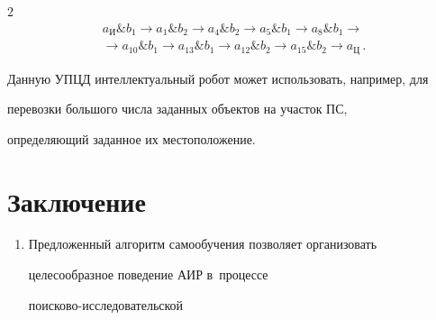 \begin{multicols}{2}
  \begin{multline*}


  a_{\mathrm{И}} \& b_1\to a_1 \& b_2\to a_4 \& b_2\to a_5 \& b_1\to a_8 \& 


b_1\to{}\\


  {}\to


  a_{10} \& b_1\to a_{13} \& b_1\to a_{12} \& b_2\to a_{15} \& b_2\to 


a_{\mathrm{Ц}}\,.


  \end{multline*}


  


  Данную УПЦД интеллектуальный робот может использовать, например, для 


перевозки большого чис\-ла заданных объектов на участок ПС, 


опре\-де\-ля\-ющий заданное их мес\-то\-по\-ло\-же\-ние. 










\section{Заключение}





\noindent


\begin{enumerate}[1.]


  \item Предложенный алгоритм са\-мо\-обуче\-ния поз\-во\-ля\-ет организовать 


целесообразное поведение АИР в~процессе  


по\-иско\-во-ис\-сле\-до\-ва\-тель\-ской\linebreak\vspace*{-9.5pt}


\end{enumerate}





\noindent


\begin{enumerate}[1.]


\setcounter{enumi}{1}



\end{enumerate}
\end{multicols}
